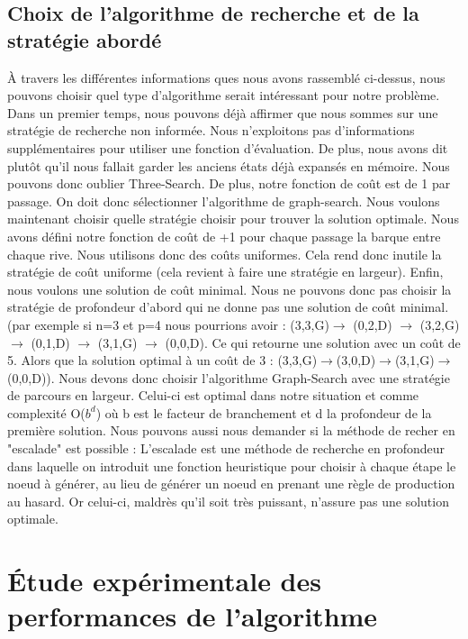 \documentclass[a4paper, 12pt, french,oneside]{book}
\begin{document}
\section{Choix de l'algorithme de recherche et de la stratégie abordé}
À travers les différentes informations ques nous avons rassemblé ci-dessus, nous pouvons choisir quel type d'algorithme serait intéressant pour notre problème. Dans un premier temps, nous pouvons déjà affirmer que nous sommes sur une stratégie de recherche non informée. Nous n'exploitons pas d'informations supplémentaires pour utiliser une fonction d'évaluation. De plus, nous avons dit plutôt qu'il nous fallait garder les anciens états déjà expansés en mémoire. Nous pouvons donc oublier Three-Search. De plus, notre fonction de coût est de 1 par passage. On doit donc sélectionner l'algorithme de graph-search. Nous voulons maintenant choisir quelle stratégie choisir pour trouver la solution optimale. Nous avons défini notre fonction de coût de +1 pour chaque passage la barque entre chaque rive. Nous utilisons donc des coûts uniformes. Cela rend donc inutile la stratégie de coût uniforme (cela revient à faire une stratégie en largeur). Enfin, nous voulons une solution de coût minimal. Nous ne pouvons donc pas choisir la stratégie de profondeur d'abord qui ne donne pas une solution de coût minimal.(par exemple si n=3 et p=4 nous pourrions avoir : (3,3,G)$\rightarrow$ (0,2,D) $\rightarrow$ (3,2,G) $\rightarrow$ (0,1,D) $\rightarrow$ (3,1,G) $\rightarrow$ (0,0,D). Ce qui retourne une solution avec un coût de 5. Alors que la solution optimal à un coût de 3 : (3,3,G)$\rightarrow$(3,0,D)$\rightarrow$(3,1,G)$\rightarrow$(0,0,D)). Nous devons donc choisir l'algorithme Graph-Search avec une stratégie de parcours en largeur. Celui-ci est optimal dans notre situation et comme complexité O($b^d$) où b est le facteur de branchement et d la profondeur de la première solution. Nous pouvons aussi nous demander si la méthode de recher en "escalade" est possible : L’escalade est une méthode de recherche en profondeur dans laquelle on introduit une fonction heuristique pour choisir à chaque étape le noeud à générer, au lieu de générer un noeud en prenant une règle de production au hasard. Or celui-ci, maldrès qu'il soit très puissant, n'assure pas une solution optimale.

\chapter{Étude expérimentale des performances de l'algorithme}
\end{document}
